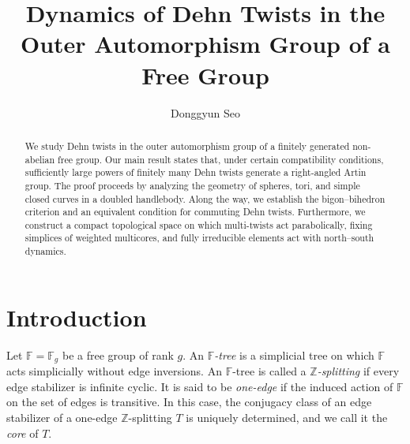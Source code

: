 \documentclass[12pt,a4paper]{amsart}
\numberwithin{equation}{section}
\newcommand{\FF}{\mathbb{F}}
\theoremstyle{plain}
\theoremstyle{definition}
\theoremstyle{remark}
\begin{document}
\title[Dynamics of Dehn twists in $\mathrm{Out}(\FF)$]{Dynamics of Dehn Twists in the Outer Automorphism Group of a Free Group}
	
\author{Donggyun Seo}
\address{Institute of Mathematical Sciences \\ Chungnam National University \\ Daejeon, Korea}



\begin{abstract}
    We study Dehn twists in the outer automorphism group of a finitely generated non-abelian free group.  
    Our main result states that, under certain compatibility conditions, sufficiently large powers of finitely many Dehn twists generate a right-angled Artin group.
    The proof proceeds by analyzing the geometry of spheres, tori, and simple closed curves in a doubled handlebody.
    Along the way, we establish the bigon--bihedron criterion and an equivalent condition for commuting Dehn twists.
    Furthermore, we construct a compact topological space on which multi-twists act parabolically, fixing simplices of weighted multicores, and fully irreducible elements act with north–south dynamics.
\end{abstract}

\maketitle




\section{Introduction}


Let $\mathbb{F} = \mathbb{F}_g$ be a free group of rank $g$.
An \emph{$\mathbb{F}$-tree} is a simplicial tree on which $\mathbb{F}$ acts simplicially without edge inversions.
An $\mathbb{F}$-tree is called a \emph{$\mathbb{Z}$-splitting} if every edge stabilizer is infinite cyclic.
It is said to be \emph{one-edge} if the induced action of $\mathbb{F}$ on the set of edges is transitive.
In this case, the conjugacy class of an edge stabilizer of a one-edge $\mathbb{Z}$-splitting $T$ is uniquely determined, and we call it the \emph{core} of $T$.
\end{document}

